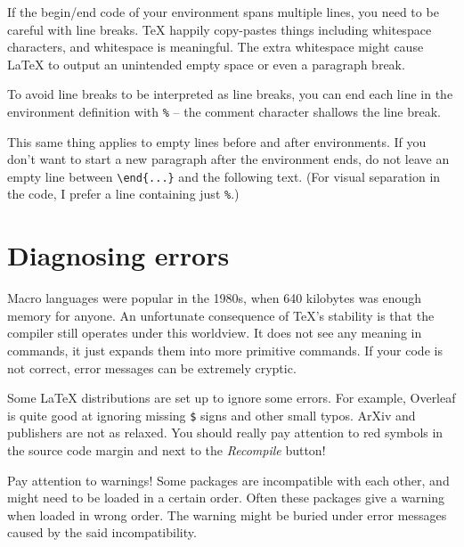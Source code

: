 \begin{gotcha}
If the begin/end code of your environment spans multiple lines,
you need to be careful with line breaks.
\TeX{} happily copy-pastes things including whitespace characters,
and whitespace is meaningful.
The extra whitespace might cause \LaTeX{} to output an unintended empty space
or even a paragraph break.

To avoid line breaks to be interpreted as line breaks,
you can end each line in the environment definition with \verb|%|
-- the comment character shallows the line break.

This same thing applies to empty lines before and after environments.
If you don't want to start a new paragraph after the environment ends,
do not leave an empty line between \verb|\end{...}| and the following text.
(For visual separation in the code, I prefer a line containing just \verb|%|.)
\end{gotcha}




%
%
%
\section{Diagnosing errors}

Macro languages were popular in the 1980s, when 640 kilobytes was enough memory for anyone.
An unfortunate consequence of \TeX's stability is that the compiler still operates under this worldview.
It does not see any meaning in commands, it just expands them into more primitive commands.
If your code is not correct, error messages can be extremely cryptic.

\begin{overleaf}
Some \LaTeX{} distributions are set up to ignore some errors.
For example, Overleaf is quite good at ignoring missing \verb|$| signs and other small typos.
ArXiv and publishers are not as relaxed.
You should really pay attention to red symbols in the source code margin
and next to the \emph{Recompile} button!
\end{overleaf}

\begin{gotcha}
Pay attention to warnings!
Some packages are incompatible with each other,
and might need to be loaded in a certain order.
Often these packages give a warning when loaded in wrong order.
The warning might be buried under error messages caused by the said incompatibility.
\end{gotcha}

